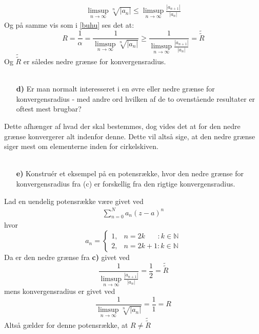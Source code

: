 \documentclass[12pt]{article}
\begin{document}
\begin{align}
\limsup_{n \rightarrow \infty} \sqrt[n]{|a_n|} \leq \limsup_{n \rightarrow \infty} \frac{|a_{n+1}|}{|a_n|}
\end{align}
Og på samme vis som i \eqref{buhu} ses det at:
\begin{equation} \label{1}
R = \frac{1}{\alpha} = \frac{1}{\limsup_{n \rightarrow \infty} \sqrt[n]{|a_n|}} \geq \frac{1}{\limsup_{n \rightarrow \infty} \frac{|a_{n+1}|}{|a_n|}} = \widetilde{\widetilde{R}}
\end{equation}
Og $\widetilde{\widetilde{R}}$ er således nedre grænse for konvergensradius.\\\\
\begin{itemize}
\item[\textbf{d)}] Er man normalt interesseret i en øvre eller nedre grænse for konvergensradius - med andre ord hvilken af de to ovenstående resultater er oftest mest brugbar?
\end{itemize}
Dette afhænger af hvad der skal bestemmes, dog vides det at for den nedre grænse konvergerer alt indenfor denne. Dette vil altså sige, at den nedre grænse siger mest om elementerne inden for cirkelskiven.\\\\
\begin{itemize}
\item[\textbf{e)}] Konstruér et eksempel på en potensrække, hvor den nedre grænse for konvergensradius fra (c) er forskellig fra den rigtige konvergensradius. 
\end{itemize}
Lad en uendelig potensrække være givet ved
\begin{align*}
\sum_{n=0}^N a_n (z-a)^n
\end{align*}
hvor
\begin{equation}
a_n=\begin{cases}
	1, & n=2k\phantom{mm}:  k \in \mathbb{N} \\
	2, & n=2k+1: k \in \mathbb{N}
	\end{cases}
\end{equation}
Da er den nedre grænse fra \textbf{c)} givet ved
\begin{equation}
\frac{1}{\limsup_{n \rightarrow \infty} \frac{|a_{n+1}|}{|a_n|}}=\frac{1}{2}=\widetilde{\widetilde{R}}
\end{equation}
mens konvergensradius er givet ved
\begin{equation}
\frac{1}{\limsup_{n \rightarrow \infty} \sqrt[n]{|a_n|}}=\frac{1}{1}=R
\end{equation}
Altså gælder for denne potensrække, at $R \neq \widetilde{\widetilde{R}}$
\end{document}
